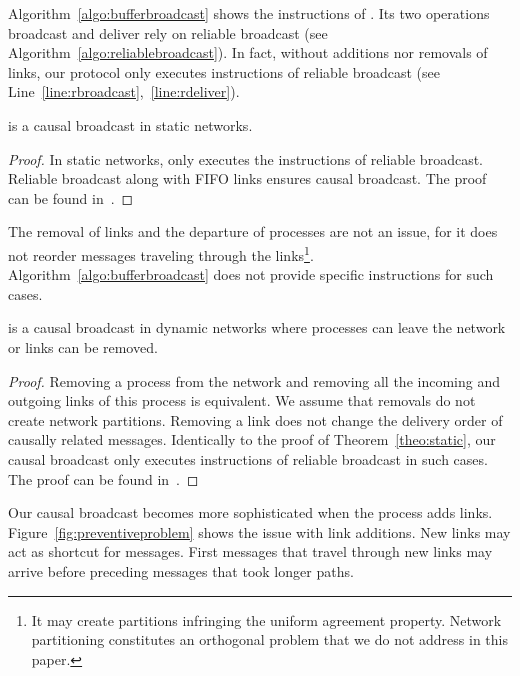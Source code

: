 Algorithm~\ref{algo:bufferbroadcast} shows the instructions of \CBROADCAST. Its
two operations broadcast and deliver rely on reliable broadcast (see
Algorithm~\ref{algo:reliablebroadcast}). In fact, without additions nor removals
of links, our protocol only executes instructions of reliable broadcast (see
Line~\ref{line:rbroadcast},~\ref{line:rdeliver}).

\begin{theorem}
  \CBROADCAST is a causal broadcast in static networks.
\end{theorem}

\begin{proof}
  In static networks, \CBROADCAST only executes the instructions of reliable
  broadcast. Reliable broadcast along with FIFO links ensures causal broadcast.
  The proof can be found in~\cite{friedman2004causal}.
\end{proof}

The removal of links and the departure of processes are not an issue, for it
does not reorder messages traveling through the links\footnote{It may create
  partitions infringing the uniform agreement property. Network partitioning
  constitutes an orthogonal problem that we do not address in this
  paper.}. Algorithm~\ref{algo:bufferbroadcast} does not provide specific
instructions for such cases.

\begin{lemma}
  \CBROADCAST is a causal broadcast in dynamic networks where processes can
  leave the network or links can be removed.
\end{lemma}

\begin{proof}
  Removing a process from the network and removing all the incoming and outgoing
  links of this process is equivalent. We assume that removals do not create
  network partitions.  Removing a link does not change the delivery order of
  causally related messages. Identically to the proof of
  Theorem~\ref{theo:static}, our causal broadcast only executes instructions of
  reliable broadcast in such cases. The proof can be found
  in~\cite{friedman2004causal}.
\end{proof}

Our causal broadcast becomes more sophisticated when the process adds links.
Figure~\ref{fig:preventiveproblem} shows the issue with link additions.  New
links may act as shortcut for messages. First messages that travel through new
links may arrive before preceding messages that took longer paths.

